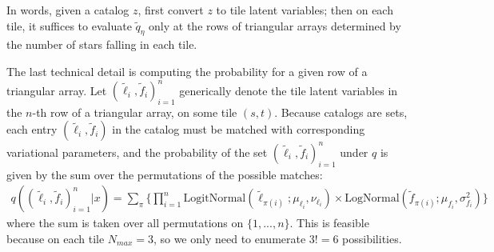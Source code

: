 In words, given a catalog $z$,
first convert $z$ to tile latent variables;
then on each tile, it suffices to evaluate $\tilde q_\eta$ only at the rows of triangular 
arrays determined by the number 
of stars falling in each tile. 

The last technical detail is computing the 
probability for 
a given row of a triangular array. 
Let $(\tilde \ell_i, \tilde f_i)_{i = 1}^n$ generically denote the tile latent variables in the $n$-th row of a triangular array, on some tile $(s,t)$.
Because catalogs are sets,
each entry $(\tilde \ell_i, \tilde f_i)$ in the catalog must 
be matched with corresponding variational parameters, 
and the probability of the set
$(\tilde \ell_i, \tilde f_i)_{i = 1}^n$ under $q$
is given by the sum over 
the permutations of the possible matches: 
\begin{align}
    q((\tilde \ell_{i}, \tilde f_{i})_{i = 1}^n | x) = \sum_\pi \Big\{ \prod_{i=1}^n \text{LogitNormal}(\tilde \ell_{\pi(i)}; \mu_{\ell_{i}}, \nu_{\ell_{i}})\times 
	\text{LogNormal}(\tilde f_{\pi(i)}; \mu_{f_{i}}, \sigma^2_{f_{i}})\Big\}
\end{align}
where the sum is taken over all permutations on $\{1, ..., n\}$. This is feasible because on each tile $N_{max} = 3$, so we only need to enumerate $3!=6$ possibilities. 